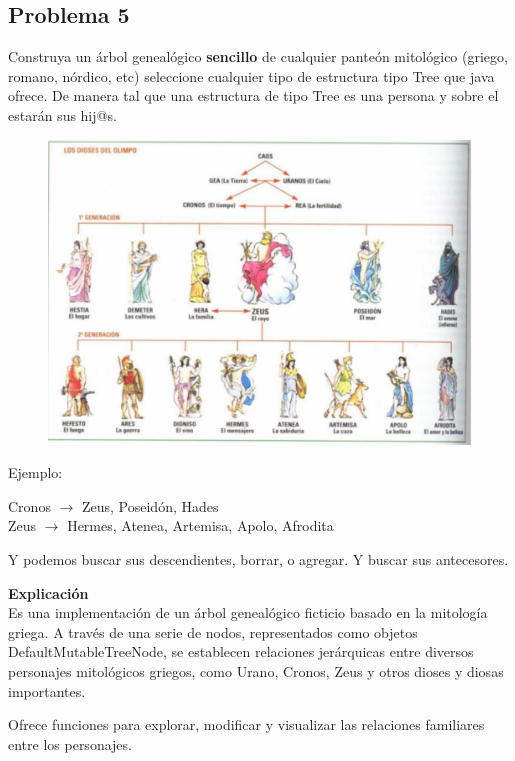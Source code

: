 \documentclass[11pt, twocolumn]{article}
\begin{document}
  \subsection*{Problema 5}
  Construya un árbol genealógico \textbf{sencillo} de cualquier panteón mitológico (griego, romano, nórdico, etc) seleccione cualquier tipo de estructura tipo Tree que java ofrece. De manera tal que una estructura de tipo Tree es una persona y sobre el estarán sus hij@s.

  \begin{figure}[ht]
    \includegraphics[width=\columnwidth, center]{Arbol.png}
  \end{figure}
  
  Ejemplo:

  Cronos $\rightarrow$ Zeus, Poseidón, Hades \\
  Zeus $\rightarrow$ Hermes, Atenea, Artemisa, Apolo, Afrodita

  Y podemos buscar sus descendientes, borrar, o agregar. Y buscar sus antecesores.

  \textbf{Explicación} \\
  Es una implementación de un árbol genealógico ficticio basado en la mitología griega. A través de una serie de nodos, representados como objetos DefaultMutableTreeNode, se establecen relaciones jerárquicas entre diversos personajes mitológicos griegos, como Urano, Cronos, Zeus y otros dioses y diosas importantes.

  Ofrece funciones para explorar, modificar y visualizar las relaciones familiares entre los personajes.  
\end{document}
